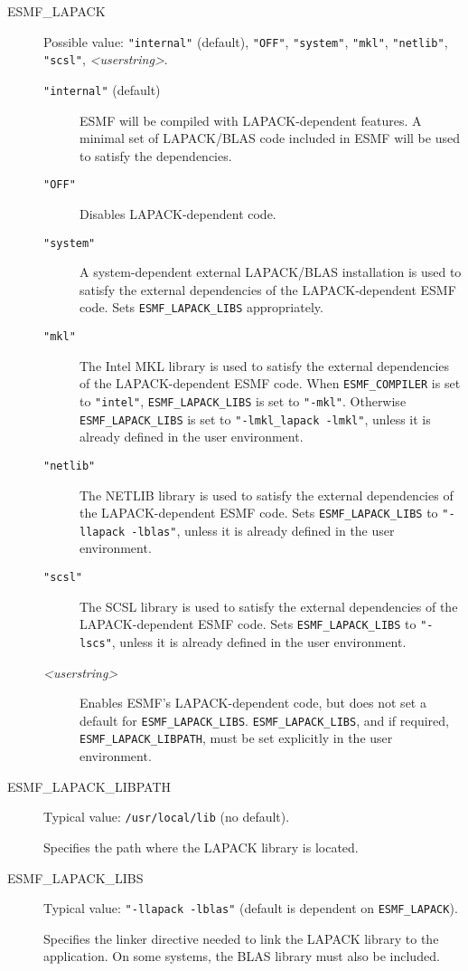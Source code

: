 \begin{description}

\item[ESMF\_LAPACK] Possible value: {\tt "internal"} (default), {\tt "OFF"},
 {\tt "system"}, {\tt "mkl"}, {\tt "netlib"}, {\tt "scsl"}, {\it <userstring>}.

\begin{description}
\item[{\tt "internal"} (default)] ESMF will be compiled with LAPACK-dependent
features. A minimal set of LAPACK/BLAS code included in ESMF will be used
to satisfy the dependencies.

\item[{\tt "OFF"}] Disables LAPACK-dependent code.
 
\item[{\tt "system"}] A system-dependent external LAPACK/BLAS installation
is used to satisfy the external dependencies of the LAPACK-dependent ESMF code.
Sets {\tt ESMF\_LAPACK\_LIBS} appropriately.

\item[{\tt "mkl"}] The Intel MKL library is used to satisfy the external 
dependencies of the LAPACK-dependent ESMF code. When {\tt ESMF\_COMPILER} is set to
{\tt "intel"}, {\tt ESMF\_LAPACK\_LIBS} is set to {\tt "-mkl"}.  Otherwise {\tt ESMF\_LAPACK\_LIBS}
is set to {\tt "-lmkl\_lapack -lmkl"}, unless it is already defined in the user 
environment.

\item[{\tt "netlib"}] The NETLIB library is used to satisfy the external 
dependencies of the LAPACK-dependent ESMF code. Sets {\tt ESMF\_LAPACK\_LIBS} to
{\tt "-llapack -lblas"}, unless it is already defined in the user environment.

\item[{\tt "scsl"}] The SCSL library is used to satisfy the external 
dependencies of the LAPACK-dependent ESMF code. Sets {\tt ESMF\_LAPACK\_LIBS} to
{\tt "-lscs"}, unless it is already defined in the user environment.

\item[{\it <userstring>}] Enables ESMF's LAPACK-dependent code, but does not set
a default for {\tt ESMF\_LAPACK\_LIBS}.  {\tt ESMF\_LAPACK\_LIBS}, and if 
required, {\tt ESMF\_LAPACK\_LIBPATH}, must be set explicitly in the user 
environment.
\end{description}

\item[ESMF\_LAPACK\_LIBPATH] Typical value: {\tt /usr/local/lib} (no default).

Specifies the path where the LAPACK library is located.

\item[ESMF\_LAPACK\_LIBS] Typical value: {\tt "-llapack -lblas"} 
(default is dependent on {\tt ESMF\_LAPACK}).

Specifies the linker directive needed to link the LAPACK library to
the application.  On some systems, the BLAS library must also be included.
\end{description}


